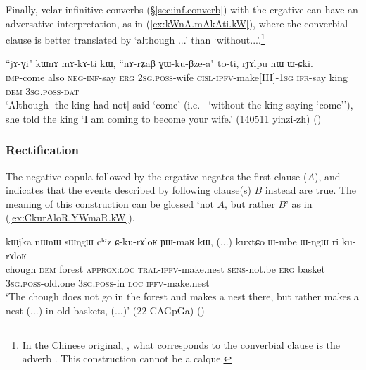 Finally, velar infinitive converbs (§\ref{sec:inf.converb}) with the ergative can have an adversative interpretation,  as in (\ref{ex:kWnA.mAkAti.kW}), where the converbial clause is better translated by `although ...' than `without...'.\footnote{In the Chinese original, , what corresponds to the converbial clause is the adverb . This construction cannot be a calque.}

\begin{exe}
\ex \label{ex:kWnA.mAkAti.kW}
\gll  ``jɤ-ɣi" kɯnɤ mɤ-kɤ-ti kɯ, ``nɤ-rʑaβ ɣɯ-ku-βze-a" to-ti, rɟɤlpu nɯ ɯ-ɕki. \\
\textsc{imp}-come also \textsc{neg}-\textsc{inf}-say \textsc{erg} \textsc{2sg}.\textsc{poss}-wife \textsc{cisl}-\textsc{ipfv}-make[III]-\textsc{1sg} \textsc{ifr}-say king \textsc{dem} \textsc{3sg}.\textsc{poss}-\textsc{dat} \\
\glt `Although [the king had not] said `come' (i.e.  `without the king saying `come''), she told the king `I am coming to become your wife.'  (140511 yinzi-zh)
()
\end{exe}

\subsubsection{Rectification} \label{sec:rectification.clauses}
The negative copula  followed by the ergative  negates the first clause ($A$), and indicates that the events described by following clause(s) $B$ instead are true. The meaning of this construction can be glossed `not $A$, but rather $B$' as in (\ref{ex:CkurAloR.YWmaR.kW}). 

\begin{exe}
\ex \label{ex:CkurAloR.YWmaR.kW}
\gll  kɯjka nɯnɯ sɯŋgɯ cʰiz ɕ-ku-rɤloʁ ɲɯ-maʁ kɯ, (...) kuxtɕo ɯ-mbe ɯ-ŋgɯ ri ku-rɤloʁ \\
chough \textsc{dem} forest \textsc{approx}:\textsc{loc} \textsc{tral}-\textsc{ipfv}-make.nest \textsc{sens}-not.be \textsc{erg} { } basket \textsc{3sg}.\textsc{poss}-old.one \textsc{3sg}.\textsc{poss}-in \textsc{loc} \textsc{ipfv}-make.nest \\
\glt `The chough does not go in the forest and makes a nest there, but rather makes a nest (...) in old baskets, (...)' (22-CAGpGa)
()
\end{exe} 

